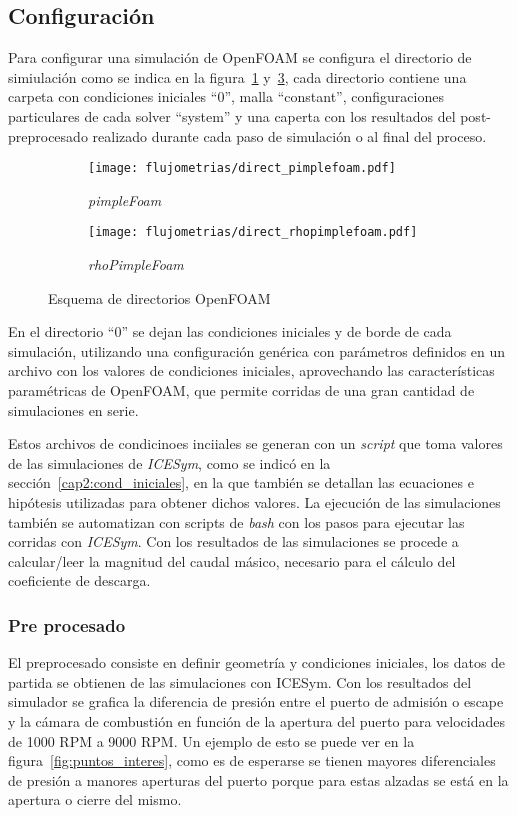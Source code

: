 
\subsection{Configuración}
%
Para configurar una simulación de OpenFOAM se configura el directorio de
simiulación como se indica en la figura~\ref{fig:direc_pf}
y~\ref{fig:direc_rpf}, cada directorio contiene una carpeta con condiciones
iniciales ``0'', malla ``constant'', configuraciones particulares de cada solver
``system'' y una caperta con los resultados del post-preprocesado realizado
durante cada paso de simulación o al final del proceso.

\begin{figure}[ht]
  \centering
  \begin{subfigure}[b]{0.4\textwidth}
    \centering
    \texttt{[image: flujometrias/direct\_pimplefoam.pdf]}
    \caption{\emph{pimpleFoam}\label{fig:direc_pf} }
  \end{subfigure}%
  \begin{subfigure}[b]{0.4\textwidth}
    \centering
    \texttt{[image: flujometrias/direct\_rhopimplefoam.pdf]}
    \caption{\emph{rhoPimpleFoam}\label{fig:direc_rpf} }
  \end{subfigure}
  \caption{Esquema de directorios OpenFOAM}
\end{figure}


En el directorio ``0'' se dejan las condiciones iniciales y de borde de cada
simulación, utilizando una configuración genérica con parámetros definidos en un
archivo con los valores de condiciones iniciales, aprovechando las
características paramétricas de OpenFOAM, que permite corridas de una gran
cantidad de simulaciones en serie.

Estos archivos de condicinoes inciiales se generan con un \emph{script} que toma
valores de las simulaciones de \emph{ICESym}, como se indicó en la
sección~\ref{cap2:cond_iniciales}, en la que también se detallan las ecuaciones
e hipótesis utilizadas para obtener dichos valores.
%
La ejecución de las simulaciones también se automatizan con scripts de
\emph{bash} con los pasos para ejecutar las corridas con \emph{ICESym}.
%
Con los resultados de las simulaciones se procede a calcular/leer la magnitud
del caudal másico, necesario para el cálculo del coeficiente de descarga.

\subsubsection{Pre procesado}
%
El preprocesado consiste en definir geometría y condiciones iniciales, los datos
de partida  se obtienen de las simulaciones con ICESym.
%
Con los resultados del simulador se grafica la diferencia de presión entre
el puerto de admisión o escape y la cámara de combustión en función de
la apertura del puerto para velocidades de 1000 RPM a 9000 RPM.
%
Un ejemplo de esto se puede ver en la figura~\ref{fig:puntos_interes}, como
es de esperarse se tienen mayores diferenciales de presión a manores aperturas
del puerto porque para estas alzadas se está en la apertura o cierre del mismo.

